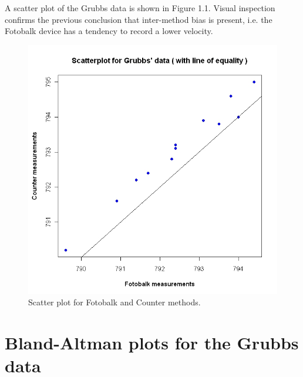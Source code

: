 \documentclass[12pt, a4paper]{report}
\theoremstyle{plain}
\theoremstyle{definition}
\theoremstyle{remark}
\begin{document}
	
	A scatter plot of the Grubbs data is shown in Figure 1.1. Visual inspection confirms the previous conclusion that inter-method bias is present, i.e. the Fotobalk device has a tendency to record a lower velocity.
	
	\begin{figure}[h!]
		\begin{center}
			\includegraphics[width=125mm]{images/GrubbsScatter.jpeg}
			\caption{Scatter plot for Fotobalk and Counter methods.}\label{GrubbsScatter}
		\end{center}
	\end{figure}

%
%	
	\section{Bland-Altman plots for the Grubbs data}
	
\end{document}
